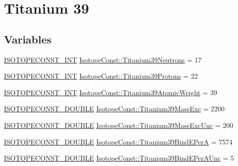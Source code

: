 \hypertarget{group___isotope_const-_titanium-_ti39}{}\section{Titanium 39}
\label{group___isotope_const-_titanium-_ti39}
\subsection*{Variables}
\begin{DoxyCompactItemize}
\item 
\mbox{\hyperlink{group___isotope_const-_macros_ga5f18360b3e99483a35c32d789e62621c}{I\+S\+O\+T\+O\+P\+E\+C\+O\+N\+S\+T\+\_\+\+I\+NT}} \mbox{\hyperlink{group___isotope_const-_titanium-_ti39_gaf656f71e13461d9dcac8102d75b4697f}{Isotope\+Const\+::\+Titanium39\+Neutrons}} = 17
\item 
\mbox{\hyperlink{group___isotope_const-_macros_ga5f18360b3e99483a35c32d789e62621c}{I\+S\+O\+T\+O\+P\+E\+C\+O\+N\+S\+T\+\_\+\+I\+NT}} \mbox{\hyperlink{group___isotope_const-_titanium-_ti39_gacecaa102e141cd2e906628c3f926b6f5}{Isotope\+Const\+::\+Titanium39\+Protons}} = 22
\item 
\mbox{\hyperlink{group___isotope_const-_macros_ga5f18360b3e99483a35c32d789e62621c}{I\+S\+O\+T\+O\+P\+E\+C\+O\+N\+S\+T\+\_\+\+I\+NT}} \mbox{\hyperlink{group___isotope_const-_titanium-_ti39_ga86df3b34ee33880bb633b2445db2e642}{Isotope\+Const\+::\+Titanium39\+Atomic\+Weight}} = 39
\item 
\mbox{\hyperlink{group___isotope_const-_macros_ga8f45a7272ce02c0b4c65c44636ed719a}{I\+S\+O\+T\+O\+P\+E\+C\+O\+N\+S\+T\+\_\+\+D\+O\+U\+B\+LE}} \mbox{\hyperlink{group___isotope_const-_titanium-_ti39_ga0e97c873b73c8711c5a827a9659d347b}{Isotope\+Const\+::\+Titanium39\+Mass\+Exc}} = 2200
\item 
\mbox{\hyperlink{group___isotope_const-_macros_ga8f45a7272ce02c0b4c65c44636ed719a}{I\+S\+O\+T\+O\+P\+E\+C\+O\+N\+S\+T\+\_\+\+D\+O\+U\+B\+LE}} \mbox{\hyperlink{group___isotope_const-_titanium-_ti39_ga7b498fc04b55ac82e49d4ac218939e65}{Isotope\+Const\+::\+Titanium39\+Mass\+Exc\+Unc}} = 200
\item 
\mbox{\hyperlink{group___isotope_const-_macros_ga8f45a7272ce02c0b4c65c44636ed719a}{I\+S\+O\+T\+O\+P\+E\+C\+O\+N\+S\+T\+\_\+\+D\+O\+U\+B\+LE}} \mbox{\hyperlink{group___isotope_const-_titanium-_ti39_gaba9b223f5f7376f5c3cfe6b528e61d4a}{Isotope\+Const\+::\+Titanium39\+Bind\+E\+PerA}} = 7574
\item 
\mbox{\hyperlink{group___isotope_const-_macros_ga8f45a7272ce02c0b4c65c44636ed719a}{I\+S\+O\+T\+O\+P\+E\+C\+O\+N\+S\+T\+\_\+\+D\+O\+U\+B\+LE}} \mbox{\hyperlink{group___isotope_const-_titanium-_ti39_gabf6beb70ec52abf7269084eeed1c766d}{Isotope\+Const\+::\+Titanium39\+Bind\+E\+Per\+A\+Unc}} = 5

\end{DoxyCompactItemize}
